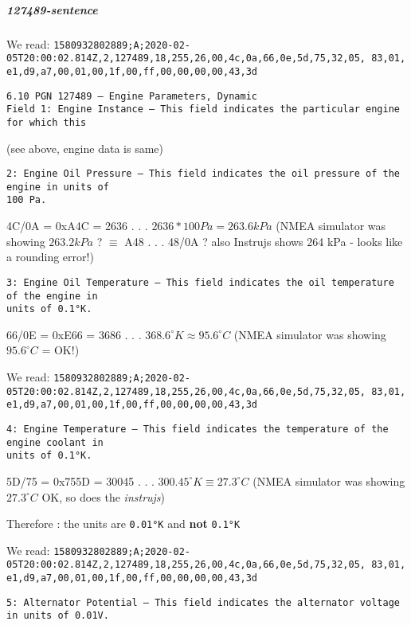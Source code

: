 \documentclass[11pt]{article}
\begin{document}
    \hypertarget{sentence}{%
\subparagraph{127489-sentence}\label{sentence}}

    We read:
\texttt{1580932802889;A;2020-02-05T20:00:02.814Z,2,127489,18,255,26,00,4c,0a,66,0e,5d,75,32,05,\ 83,01,e1,d9,a7,00,01,00,1f,00,ff,00,00,00,00,43,3d}

\begin{verbatim}
6.10 PGN 127489 – Engine Parameters, Dynamic
Field 1: Engine Instance – This field indicates the particular engine for which this
\end{verbatim}

(see above, engine data is same)

\begin{verbatim}
2: Engine Oil Pressure – This field indicates the oil pressure of the engine in units of
100 Pa.
\end{verbatim}

4C/0A = 0xA4C = 2636 . . . \(2636 * 100Pa = 263.6kPa\) (NMEA simulator
was showing \(263.2kPa\) ? \(\equiv\) A48 . . . 48/0A ? also Instrujs
shows 264 kPa - looks like a rounding error!)

    \begin{verbatim}
3: Engine Oil Temperature – This field indicates the oil temperature of the engine in
units of 0.1°K.
\end{verbatim}

66/0E = 0xE66 = 3686 . . . \(368.6^{\circ}K \approx 95.6^{\circ}C\)
(NMEA simulator was showing \(95.6^{\circ}C\) = OK!)

    We read:
\texttt{1580932802889;A;2020-02-05T20:00:02.814Z,2,127489,18,255,26,00,4c,0a,66,0e,5d,75,32,05,\ 83,01,e1,d9,a7,00,01,00,1f,00,ff,00,00,00,00,43,3d}

\begin{verbatim}
4: Engine Temperature – This field indicates the temperature of the engine coolant in
units of 0.1°K.
\end{verbatim}

5D/75 = 0x755D = 30045 . . . \(300.45^{\circ}K \equiv 27.3^{\circ}C\)
(NMEA simulator was showing \(27.3^{\circ}C\) OK, so does the
\emph{instrujs})

Therefore : the units are \texttt{0.01°K} and \textbf{not}
\texttt{0.1°K}

    We read:
\texttt{1580932802889;A;2020-02-05T20:00:02.814Z,2,127489,18,255,26,00,4c,0a,66,0e,5d,75,32,05,\ 83,01,e1,d9,a7,00,01,00,1f,00,ff,00,00,00,00,43,3d}

\begin{verbatim}
5: Alternator Potential – This field indicates the alternator voltage in units of 0.01V. 
\end{verbatim}
\end{document}
